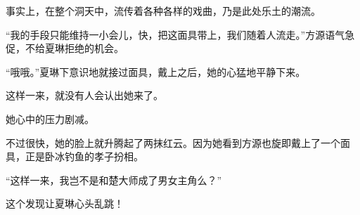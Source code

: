 \begin{this_body}
事实上，在整个洞天中，流传着各种各样的戏曲，乃是此处乐土的潮流。

“我的手段只能维持一小会儿，快，把这面具带上，我们随着人流走。”方源语气急促，不给夏琳拒绝的机会。

“哦哦。”夏琳下意识地就接过面具，戴上之后，她的心猛地平静下来。

这样一来，就没有人会认出她来了。

她心中的压力剧减。

不过很快，她的脸上就升腾起了两抹红云。因为她看到方源也旋即戴上了一个面具，正是卧冰钓鱼的孝子扮相。

“这样一来，我岂不是和楚大师成了男女主角么？”

这个发现让夏琳心头乱跳！

\end{this_body}

